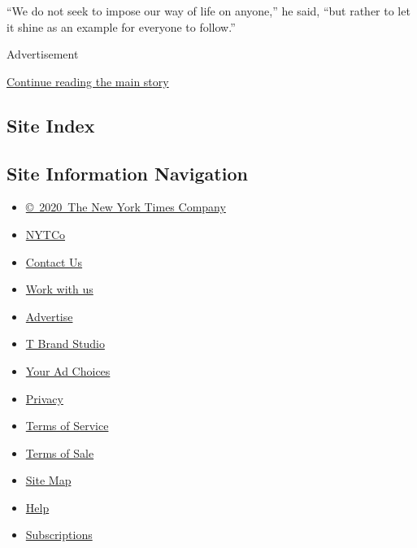 ``We do not seek to impose our way of life on anyone,'' he said, ``but
rather to let it shine as an example for everyone to follow.''

Advertisement

\protect\hyperlink{after-bottom}{Continue reading the main story}

\hypertarget{site-index}{%
\subsection{Site Index}\label{site-index}}

\hypertarget{site-information-navigation}{%
\subsection{Site Information
Navigation}\label{site-information-navigation}}

\begin{itemize}
\tightlist
\item
  \href{https://help.nytimes.com/hc/en-us/articles/115014792127-Copyright-notice}{©~2020~The
  New York Times Company}
\end{itemize}

\begin{itemize}
\tightlist
\item
  \href{https://www.nytco.com/}{NYTCo}
\item
  \href{https://help.nytimes.com/hc/en-us/articles/115015385887-Contact-Us}{Contact
  Us}
\item
  \href{https://www.nytco.com/careers/}{Work with us}
\item
  \href{https://nytmediakit.com/}{Advertise}
\item
  \href{http://www.tbrandstudio.com/}{T Brand Studio}
\item
  \href{https://www.nytimes.com/privacy/cookie-policy\#how-do-i-manage-trackers}{Your
  Ad Choices}
\item
  \href{https://www.nytimes.com/privacy}{Privacy}
\item
  \href{https://help.nytimes.com/hc/en-us/articles/115014893428-Terms-of-service}{Terms
  of Service}
\item
  \href{https://help.nytimes.com/hc/en-us/articles/115014893968-Terms-of-sale}{Terms
  of Sale}
\item
  \href{https://spiderbites.nytimes.com}{Site Map}
\item
  \href{https://help.nytimes.com/hc/en-us}{Help}
\item
  \href{https://www.nytimes.com/subscription?campaignId=37WXW}{Subscriptions}
\end{itemize}

